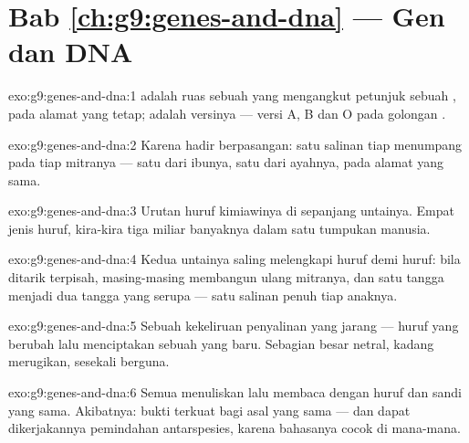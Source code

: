 \section*{Bab \ref{ch:g9:genes-and-dna} --- Gen dan DNA}

\begin{solution}{exo:g9:genes-and-dna:1}
 adalah ruas sebuah  yang mengangkut petunjuk
sebuah , pada alamat yang tetap;  adalah versinya
--- versi A, B dan O pada  golongan .
\end{solution}

\begin{solution}{exo:g9:genes-and-dna:2}
Karena  hadir berpasangan: satu salinan tiap
 menumpang pada tiap mitranya --- satu dari ibunya,
satu dari ayahnya, pada alamat yang sama.
\end{solution}

\begin{solution}{exo:g9:genes-and-dna:3}
Urutan huruf kimiawinya di sepanjang untainya. Empat jenis
huruf, kira-kira tiga miliar banyaknya dalam satu tumpukan
manusia.
\end{solution}

\begin{solution}{exo:g9:genes-and-dna:4}
Kedua untainya saling melengkapi huruf demi huruf: bila
ditarik terpisah, masing-masing membangun ulang mitranya,
dan satu tangga menjadi dua tangga yang serupa --- satu
salinan penuh tiap  anaknya.
\end{solution}

\begin{solution}{exo:g9:genes-and-dna:5}
Sebuah kekeliruan penyalinan yang jarang --- huruf yang
berubah lalu menciptakan sebuah  yang baru. Sebagian
besar netral, kadang merugikan, sesekali berguna.
\end{solution}

\begin{solution}{exo:g9:genes-and-dna:6}
Semua  menuliskan lalu membaca  dengan
huruf dan sandi  yang sama. Akibatnya: bukti terkuat bagi
asal yang sama --- dan dapat dikerjakannya pemindahan 
antarspesies, karena bahasanya cocok di mana-mana.
\end{solution}

